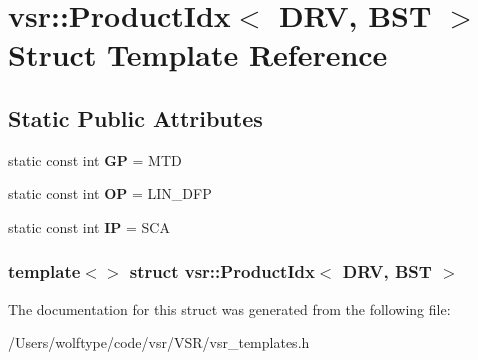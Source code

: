 \hypertarget{structvsr_1_1_product_idx_3_01_d_r_v_00_01_b_s_t_01_4}{\section{vsr\-:\-:Product\-Idx$<$ D\-R\-V, B\-S\-T $>$ Struct Template Reference}
\label{structvsr_1_1_product_idx_3_01_d_r_v_00_01_b_s_t_01_4}
}
\subsection*{Static Public Attributes}
\begin{DoxyCompactItemize}
\item 
\hypertarget{structvsr_1_1_product_idx_3_01_d_r_v_00_01_b_s_t_01_4_aefe621a00e6866882181f1bcfcd271ea}{static const int {\bfseries G\-P} = M\-T\-D}\label{structvsr_1_1_product_idx_3_01_d_r_v_00_01_b_s_t_01_4_aefe621a00e6866882181f1bcfcd271ea}

\item 
\hypertarget{structvsr_1_1_product_idx_3_01_d_r_v_00_01_b_s_t_01_4_a5ddb2cf1b2716ffeee63f9b21b643e03}{static const int {\bfseries O\-P} = L\-I\-N\-\_\-\-D\-F\-P}\label{structvsr_1_1_product_idx_3_01_d_r_v_00_01_b_s_t_01_4_a5ddb2cf1b2716ffeee63f9b21b643e03}

\item 
\hypertarget{structvsr_1_1_product_idx_3_01_d_r_v_00_01_b_s_t_01_4_ad65ded180a03ff27115ed4a70de4b469}{static const int {\bfseries I\-P} = S\-C\-A}\label{structvsr_1_1_product_idx_3_01_d_r_v_00_01_b_s_t_01_4_ad65ded180a03ff27115ed4a70de4b469}

\end{DoxyCompactItemize}
\subsubsection*{template$<$$>$ struct vsr\-::\-Product\-Idx$<$ D\-R\-V, B\-S\-T $>$}



The documentation for this struct was generated from the following file\-:\begin{DoxyCompactItemize}
\item 
/\-Users/wolftype/code/vsr/\-V\-S\-R/vsr\-\_\-templates.\-h\end{DoxyCompactItemize}
